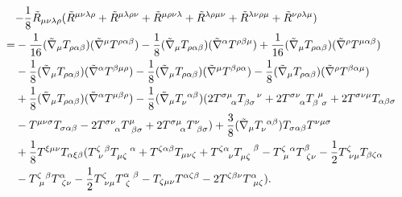 \begin{align}
\lefteqn{-\frac{1}{8}\tilde{R}_{\mu\nu\lambda\rho}(
\tilde{R}^{\mu\nu\lambda\rho}+\tilde{R}^{\mu\lambda\rho\nu}+\tilde{R}^{\mu\rho\nu\lambda}
 +\tilde{R}^{\lambda\rho\mu\nu}+\tilde{R}^{\lambda\nu\rho\mu}+\tilde{R}^{\nu\rho\lambda\mu}
)}\nonumber \\
= & -\frac{1}{16}(\tilde{\nabla}_\mu T_{\rho\alpha\beta})(\tilde{\nabla}^\mu T^{\rho\alpha\beta})
-\frac{1}{8}(\tilde{\nabla}_\mu T_{\rho\alpha\beta})(\tilde{\nabla}^\alpha T^{\rho\beta\mu})
+\frac{1}{16}(\tilde{\nabla}_\mu T_{\rho\alpha\beta})(\tilde{\nabla}^\rho T^{\mu\alpha\beta}) \nonumber \\
& -\frac{1}{8}(\tilde{\nabla}_\mu T_{\rho\alpha\beta})(\tilde{\nabla}^\alpha T^{\beta\mu\rho})
-\frac{1}{8}(\tilde{\nabla}_\mu T_{\rho\alpha\beta})(\tilde{\nabla}^\mu T^{\beta\rho\alpha})
-\frac{1}{8}(\tilde{\nabla}_\mu T_{\rho\alpha\beta})(\tilde{\nabla}^\rho T^{\beta\alpha\mu})
\nonumber \\
& +\frac{1}{8}(\tilde{\nabla}_\mu T_{\rho\alpha\beta})(\tilde{\nabla}^\alpha T^{\mu\beta\rho}) 
-\frac{1}{8}(\tilde{\nabla}_\mu T_\nu^{\ \alpha\beta})(
  2T^{\sigma\mu}_{\ \ \ \alpha}T_{\beta\sigma}^{\ \ \ \nu}+ 2T^{\sigma\nu}_{\ \ \ \alpha}T_{\beta\ \sigma}^{\ \mu}
  +2T^{\sigma\nu\mu}T_{\alpha\beta\sigma}
\nonumber \\
& -T^{\mu\nu\sigma}T_{\sigma\alpha\beta}
  -2T^{\sigma\nu}_{\ \ \ \alpha}T^\mu_{\ \beta\sigma}+2T^{\sigma\mu}_{\ \ \ \alpha}T^\nu_{\ \beta\sigma})
+\frac{3}{8}(\tilde{\nabla}_\mu T_\nu^{\ \alpha\beta})T_{\sigma\alpha\beta}T^{\nu\mu\sigma} \nonumber \\
& +\frac{1}{8}
T^{\xi\mu\nu}T_{\alpha\xi\beta}(T^{\zeta\ \beta}_{\ \nu}T_{\mu\zeta}^{\ \ \ \alpha}
+T^{\zeta\alpha\beta}T_{\mu\nu\zeta}
+T^{\zeta\alpha}_{\ \ \ \nu}T_{\mu\zeta}^{\ \ \ \beta} 
-T^{\zeta\ \alpha}_{\ \mu}T_{\ \zeta\nu}^{\beta}
-\frac{1}{2}T^\zeta_{\ \nu\mu}T_{\beta\zeta\alpha} \nonumber \\
& -T^{\zeta\ \beta}_{\ \mu}T_{\ \zeta\nu}^{\alpha}
-\frac{1}{2}T^\zeta_{\ \nu\mu}T^{\alpha\ \beta}_{\ \zeta} 
-T_{\zeta\mu\nu}T^{\alpha\zeta\beta}-2T^{\zeta\beta\nu}T^\alpha_{\ \mu\zeta}).

\end{align}
